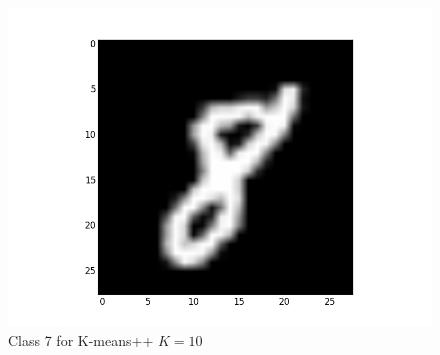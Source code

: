 \documentclass[submit]{harvardml}
\begin{document}
\begin{figure}[ht]
    \includegraphics[scale=0.20]{K10-representative-6-2}
    \caption{Class 7 for K-means++ $K=10$}
\end{figure}
\end{document}
